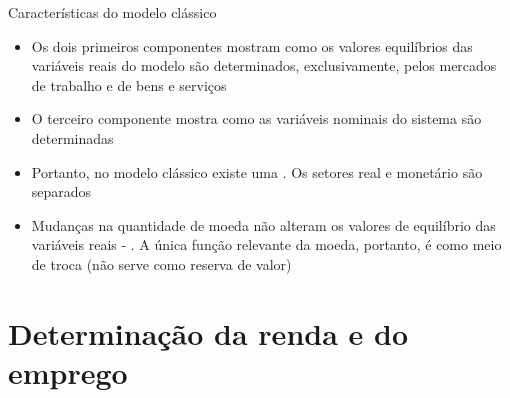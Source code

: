 \documentclass[10pt]{beamer}
\begin{document}
\begin{frame}{Características do modelo clássico}
    \begin{itemize}
        \item Os dois primeiros componentes mostram como os valores equilíbrios das variáveis reais do modelo são determinados, exclusivamente, pelos mercados de trabalho e de bens e serviços\bigskip

        \item O terceiro componente mostra como as variáveis nominais do sistema são determinadas \bigskip
        \item Portanto, no modelo clássico existe uma . Os setores real e monetário são separados\bigskip

        \item Mudanças na quantidade de moeda não alteram os valores de equilíbrio das variáveis reais - . A única função relevante da moeda, portanto, é como meio de troca (não serve como reserva de valor)
    \end{itemize}
\end{frame}

\section{Determinação da renda e do emprego}
\end{document}
